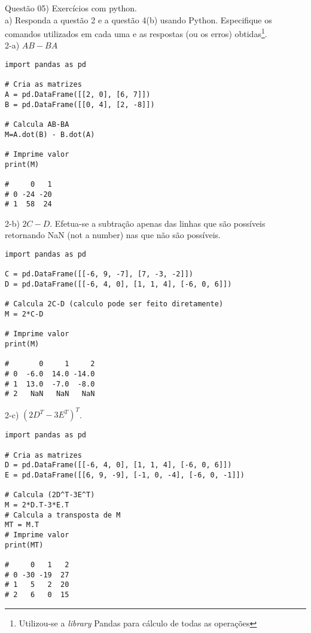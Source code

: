 
\noindent \textcolor{COLOR1}{Questão 05)} Exercícios com python.
\\

a) Responda a questão 2 e a questão 4(b) usando Python. Especifique os comandos utilizados em cada uma e as respostas (ou os erros) obtidas\footnote{Utilizou-se a \textit{library} Pandas para cálculo de todas as operações}.
\\

2-a) $AB-BA$
\\

\begin{lstlisting}
import pandas as pd

# Cria as matrizes
A = pd.DataFrame([[2, 0], [6, 7]])
B = pd.DataFrame([[0, 4], [2, -8]])

# Calcula AB-BA
M=A.dot(B) - B.dot(A)

# Imprime valor
print(M)

#     0   1
# 0 -24 -20
# 1  58  24
\end{lstlisting}


2-b) $2C-D$. Efetua-se a subtração apenas das linhas que são possíveis retornando NaN (not a number) nas que não são possíveis.
\\

\begin{lstlisting}
import pandas as pd

C = pd.DataFrame([[-6, 9, -7], [7, -3, -2]])
D = pd.DataFrame([[-6, 4, 0], [1, 1, 4], [-6, 0, 6]])

# Calcula 2C-D (calculo pode ser feito diretamente)
M = 2*C-D

# Imprime valor
print(M)

#       0     1     2
# 0  -6.0  14.0 -14.0
# 1  13.0  -7.0  -8.0
# 2   NaN   NaN   NaN
\end{lstlisting}

2-c) $(2D^T-3E^T)^T$.
\\

\begin{lstlisting}
import pandas as pd

# Cria as matrizes
D = pd.DataFrame([[-6, 4, 0], [1, 1, 4], [-6, 0, 6]])
E = pd.DataFrame([[6, 9, -9], [-1, 0, -4], [-6, 0, -1]])
    
# Calcula (2D^T-3E^T)
M = 2*D.T-3*E.T
# Calcula a transposta de M
MT = M.T
# Imprime valor
print(MT)
    
#     0   1   2
# 0 -30 -19  27
# 1   5   2  20
# 2   6   0  15
\end{lstlisting}


